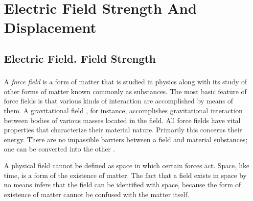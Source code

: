 





\chapter{Electric Field Strength And Displacement}
\label{ch-15}

\section{Electric Field. Field Strength}
\label{sec-15.1}

\subsection{}\label{15.1.1} A \emph{force field} is a form of matter that is studied in physics along with its study of other forms of matter known commonly as substances. The most basic feature of force fields is that various kinds of interaction are accomplished by means of them. A gravitational field , for instance, accomplishes gravitational interaction between bodies of various masses located in the field. All force fields have vital properties that characterize their material nature. Primarily this concerns their energy. There are no impassible barriers between a field and material substances; one can be converted into the other .

A physical field cannot be defined as space in which certain forces act. Space, like time, is a form of the existence of matter. The fact that a field exists in space by no means infers that the field can be identified with space, because the form of existence of matter cannot be confused with the matter itself.

